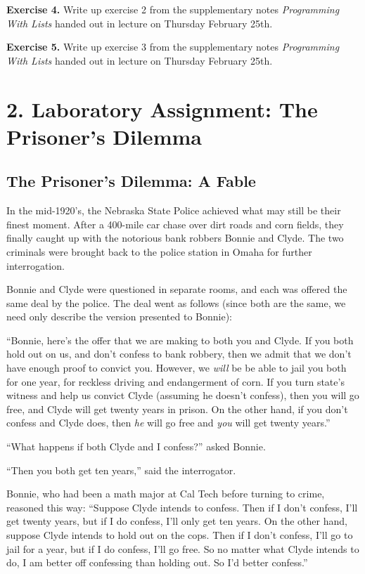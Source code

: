 \vpar
{\bf Exercise 4.} Write up exercise 2 from the supplementary notes {\it
Programming With Lists} handed out in lecture on Thursday February 25th.

\vpar
{\bf Exercise 5.} Write up exercise 3 from the supplementary notes {\it
Programming With Lists} handed out in lecture on Thursday February 25th.


\chapter{2. Laboratory Assignment: The Prisoner's Dilemma}

\section{The Prisoner's Dilemma: A Fable}

In the mid-1920's, the Nebraska State Police achieved what may still
be their finest moment. After a 400-mile car chase over dirt roads and
corn fields, they finally caught up with the notorious bank robbers
Bonnie and Clyde. The two criminals were brought back to the police
station in Omaha for further interrogation.

Bonnie and Clyde were questioned in separate rooms, and each was
offered the same deal by the police. The deal went as follows (since
both are the same, we need only describe the version presented to
Bonnie):

``Bonnie, here's the offer that we are making to both you and Clyde.
If you both hold out on us, and don't confess to bank robbery, then we
admit that we don't have enough proof to convict you. However, we {\it
will} be be able to jail you both for one year, for reckless driving
and endangerment of corn. If you turn state's witness and help us
convict Clyde (assuming he doesn't confess), then you will go free,
and Clyde will get twenty years in prison. On the other hand, if you
don't confess and Clyde does, then {\it he} will go free and {\it you}
will get twenty years.''

``What happens if both Clyde and I confess?'' asked Bonnie.

``Then you both get ten years,'' said the interrogator.

Bonnie, who had been a math major at Cal Tech before turning to crime,
reasoned this way: ``Suppose Clyde intends to confess.  Then if I
don't confess, I'll get twenty years, but if I do confess, I'll only
get ten years. On the other hand, suppose Clyde intends to hold out on
the cops. Then if I don't confess, I'll go to jail for a year, but if
I do confess, I'll go free.  So no matter what Clyde intends to do, I
am better off confessing than holding out. So I'd better confess.''


